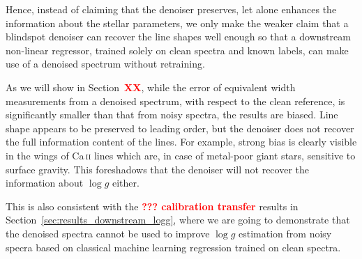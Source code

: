 \documentclass[twocolumn]{aastex7}
\newcommand{\ld}[1]{\textcolor{red}{\textbf{#1}}}
\begin{document}
Hence, instead of claiming that the denoiser preserves, let alone enhances the information about the stellar parameters, we only make the weaker claim that a blindspot denoiser can recover the line shapes well enough so that a downstream non-linear regressor, trained solely on clean spectra and known labels, can make use of a denoised spectrum without retraining.

As we will show in Section~\ld{XX}, while the error of equivalent width measurements from a denoised spectrum, with respect to the clean reference, is significantly smaller than that from noisy spectra, the results are biased. Line shape appears to be preserved to leading order, but the denoiser does not recover the full information content of the lines. For example, strong bias is clearly visible in the wings of Ca\,\textsc{ii} lines which are, in case of metal-poor giant stars, sensitive to surface gravity. This foreshadows that the denoiser will not recover the information about $\log g$ either.

This is also consistent with the \ld{??? calibration transfer} results in Section~\ref{sec:results_downstream_logg}, where we are going to demonstrate that the denoised spectra cannot be used to improve $\log g$ estimation from noisy specra based on classical machine learning regression trained on clean spectra.

%
%
\end{document}
